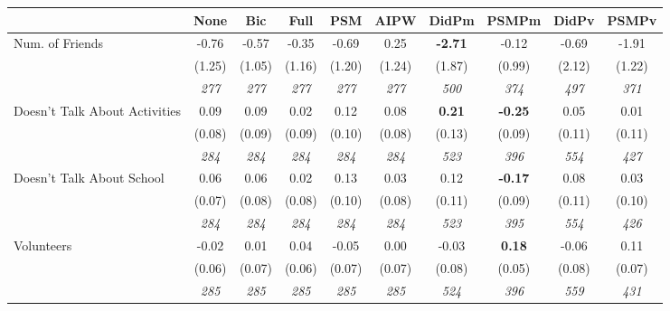 \begin{tabular}{l c c c c c c c c c}
\toprule
 & None & Bic & Full & PSM & AIPW & DidPm & PSMPm & DidPv & PSMPv \\
\midrule
Num. of Friends & -0.76 & -0.57 & -0.35 & -0.69 & 0.25 & \textbf{ -2.71 } & -0.12 & -0.69 & -1.91 \\
& (1.25) & (1.05) & (1.16) & (1.20) & (1.24) & (1.87) & (0.99) & (2.12) & (1.22) \\
& \textit{ 277 } & \textit{ 277 } & \textit{ 277 } & \textit{ 277 } & \textit{ 277 } & \textit{ 500 } & \textit{ 374 } & \textit{ 497 } & \textit{ 371 } \\
Doesn't Talk About Activities & 0.09 & 0.09 & 0.02 & 0.12 & 0.08 & \textbf{ 0.21 } & \textbf{-0.25} & 0.05 & 0.01 \\
& (0.08) & (0.09) & (0.09) & (0.10) & (0.08) & (0.13) & (0.09) & (0.11) & (0.11) \\
& \textit{ 284 } & \textit{ 284 } & \textit{ 284 } & \textit{ 284 } & \textit{ 284 } & \textit{ 523 } & \textit{ 396 } & \textit{ 554 } & \textit{ 427 } \\
Doesn't Talk About School & 0.06 & 0.06 & 0.02 & 0.13 & 0.03 & 0.12 & \textbf{-0.17} & 0.08 & 0.03 \\
& (0.07) & (0.08) & (0.08) & (0.10) & (0.08) & (0.11) & (0.09) & (0.11) & (0.10) \\
& \textit{ 284 } & \textit{ 284 } & \textit{ 284 } & \textit{ 284 } & \textit{ 284 } & \textit{ 523 } & \textit{ 395 } & \textit{ 554 } & \textit{ 426 } \\
Volunteers & -0.02 & 0.01 & 0.04 & -0.05 & 0.00 & -0.03 & \textbf{0.18} & -0.06 & 0.11 \\
& (0.06) & (0.07) & (0.06) & (0.07) & (0.07) & (0.08) & (0.05) & (0.08) & (0.07) \\
& \textit{ 285 } & \textit{ 285 } & \textit{ 285 } & \textit{ 285 } & \textit{ 285 } & \textit{ 524 } & \textit{ 396 } & \textit{ 559 } & \textit{ 431 } \\
\bottomrule
\end{tabular}
